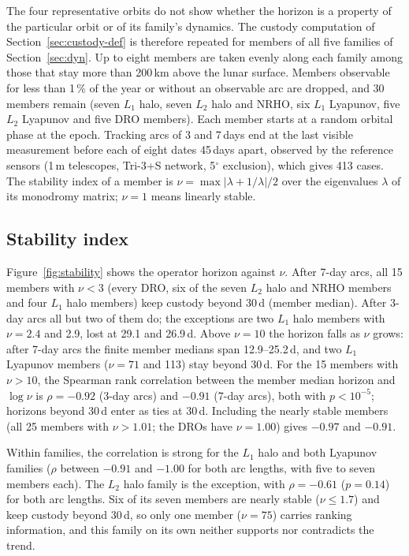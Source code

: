 \documentclass[pdflatex,sn-mathphys-num]{sn-jnl}
\begin{document}
The four representative orbits do not show whether the horizon is a property of the particular orbit or
of its family's dynamics. The custody computation of Section~\ref{sec:custody-def} is therefore
repeated for members of all five families of Section~\ref{sec:dyn}. Up to eight members are taken
evenly along each family among those that stay more than 200\,km above the lunar surface. Members
observable for less than 1\,\% of the year or without an observable arc are dropped, and 30 members
remain (seven $L_1$ halo, seven $L_2$ halo and NRHO, six $L_1$ Lyapunov, five $L_2$ Lyapunov and five
DRO members). Each member starts at a random orbital phase at the epoch. Tracking arcs of 3 and
7\,days end at the last visible measurement before each of eight dates 45\,days apart, observed by the
reference sensors (1\,m telescopes, Tri-3+S network, 5$^\circ$ exclusion), which gives 413 cases. The
stability index of a member is $\nu = \max |\lambda + 1/\lambda|/2$ over the eigenvalues $\lambda$ of
its monodromy matrix; $\nu = 1$ means linearly stable.

\subsection{Stability index}
Figure~\ref{fig:stability} shows the operator horizon against $\nu$. After 7-day arcs, all 15 members
with $\nu < 3$ (every DRO, six of the seven $L_2$ halo and NRHO members and four $L_1$ halo members)
keep custody beyond 30\,d (member median). After 3-day arcs all but two of them do; the exceptions are
two $L_1$ halo members with $\nu = 2.4$ and 2.9, lost at 29.1 and 26.9\,d. Above $\nu = 10$ the horizon falls as $\nu$ grows:
after 7-day arcs the finite member medians span 12.9--25.2\,d, and two $L_1$ Lyapunov members
($\nu = 71$ and 113) stay beyond 30\,d. For the 15 members with $\nu > 10$, the Spearman rank
correlation between the member median horizon and $\log\nu$ is $\rho = -0.92$ (3-day arcs) and
$-0.91$ (7-day arcs), both with $p < 10^{-5}$; horizons beyond 30\,d enter as ties at 30\,d.
Including the nearly stable members (all 25 members with $\nu > 1.01$; the DROs have $\nu = 1.00$)
gives $-0.97$ and $-0.91$.

Within families, the correlation is strong for the $L_1$ halo and both Lyapunov families ($\rho$
between $-0.91$ and $-1.00$ for both arc lengths, with five to seven members each). The $L_2$ halo
family is the exception, with $\rho = -0.61$ ($p = 0.14$) for both arc lengths. Six of its seven
members are nearly stable ($\nu \le 1.7$) and keep custody beyond 30\,d, so only one member
($\nu = 75$) carries ranking information, and this family on its own neither supports nor contradicts
the trend.
\end{document}
